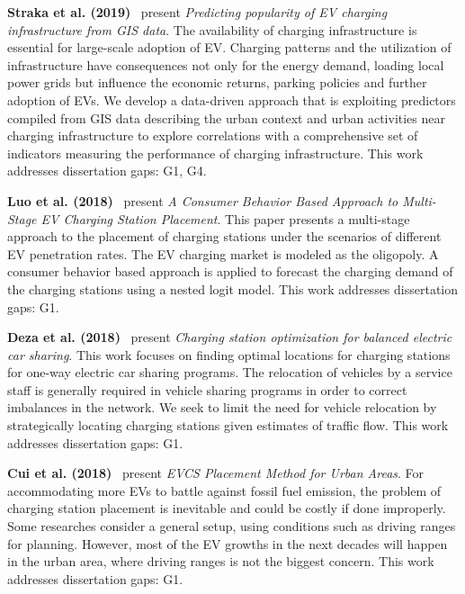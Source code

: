 \documentclass[letterpaper, 12pt, oneside, doublespacing]{Thesis}
\begin{document}
\noindent \textbf{Straka et al. (2019)}~\cite{predicting_popularity_2019} present \textit{Predicting popularity of EV charging infrastructure from GIS data}. The availability of charging infrastructure is essential for large-scale adoption of EV. Charging patterns and the utilization of infrastructure have consequences not only for the energy demand, loading local power grids but influence the economic returns, parking policies and further adoption of EVs. We develop a data-driven approach that is exploiting predictors compiled from GIS data describing the urban context and urban activities near charging infrastructure to explore correlations with a comprehensive set of indicators measuring the performance of charging infrastructure. This work addresses dissertation gaps: G1, G4.



\noindent \textbf{Luo et al. (2018)}~\cite{a_consumer_2018} present \textit{A Consumer Behavior Based Approach to Multi-Stage EV Charging Station Placement}. This paper presents a multi-stage approach to the placement of charging stations under the scenarios of different EV penetration rates. The EV charging market is modeled as the oligopoly. A consumer behavior based approach is applied to forecast the charging demand of the charging stations using a nested logit model. This work addresses dissertation gaps: G1.



\noindent \textbf{Deza et al. (2018)}~\cite{charging_station_2018} present \textit{Charging station optimization for balanced electric car sharing}. This work focuses on finding optimal locations for charging stations for one-way electric car sharing programs. The relocation of vehicles by a service staff is generally required in vehicle sharing programs in order to correct imbalances in the network. We seek to limit the need for vehicle relocation by strategically locating charging stations given estimates of traffic flow. This work addresses dissertation gaps: G1.



\noindent \textbf{Cui et al. (2018)}~\cite{electric_vehicle_2018} present \textit{EVCS Placement Method for Urban Areas}. For accommodating more EVs to battle against fossil fuel emission, the problem of charging station placement is inevitable and could be costly if done improperly. Some researches consider a general setup, using conditions such as driving ranges for planning. However, most of the EV growths in the next decades will happen in the urban area, where driving ranges is not the biggest concern. This work addresses dissertation gaps: G1.
\end{document}
